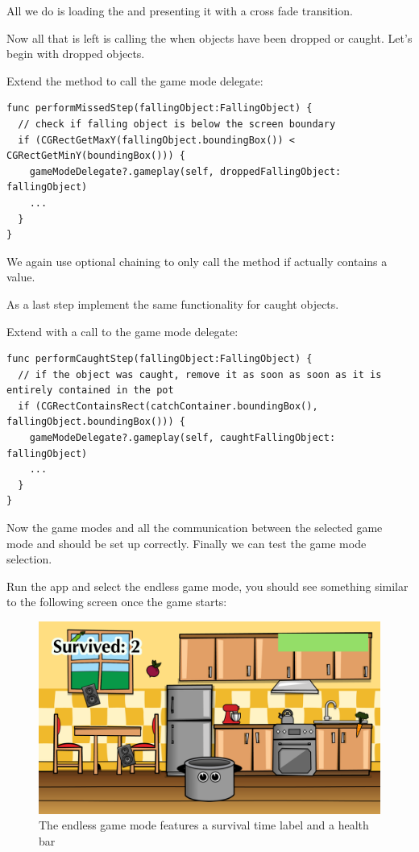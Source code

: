 All we do is loading the  and presenting it with a cross
fade transition.

Now all that is left is calling the  when objects
have been dropped or caught. Let's begin with dropped objects.

\begin{leftbar}
Extend the  method to call the game mode
delegate:
\begin{lstlisting}
func performMissedStep(fallingObject:FallingObject) {
  // check if falling object is below the screen boundary
  if (CGRectGetMaxY(fallingObject.boundingBox()) < CGRectGetMinY(boundingBox())) {
    gameModeDelegate?.gameplay(self, droppedFallingObject: fallingObject)
    ...
  }
}
\end{lstlisting}
\end{leftbar}
We again use optional chaining to only call the
 method if
 actually contains a value.

As a last step implement the same functionality for caught objects.
\begin{leftbar}
Extend  with a call to the game mode delegate:
\begin{lstlisting}
func performCaughtStep(fallingObject:FallingObject) {
  // if the object was caught, remove it as soon as soon as it is entirely contained in the pot
  if (CGRectContainsRect(catchContainer.boundingBox(), fallingObject.boundingBox())) {
    gameModeDelegate?.gameplay(self, caughtFallingObject: fallingObject)
    ...
  }
}
\end{lstlisting}
\end{leftbar}

Now the game modes and all the communication between the selected game mode and
 should be set up correctly. Finally we can test the game
mode selection. 

Run the app and select the endless game mode, you should see something
similar to the following screen once the game starts:

\begin{figure}[H]
    \centering
    \includegraphics[width=0.5\linewidth]{images/Chapter7/endless_game_with_ui.png}
    \caption{The endless game mode features a survival time label and a health
    bar}
\end{figure}

